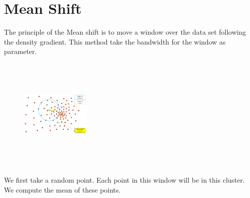 \section{Mean Shift}

The principle of the Mean shift is to move a window over the data set following the density gradient. This method take the bandwidth for the window as parameter.\\
\begin{figure}[h!]
\includegraphics[width=0.3\textwidth, height=5.5cm]{Image/algo-meanshift1.png}
\end{figure}

We first take a random point. Each point in this window will be in this cluster. We compute the mean of these points.


\begin{center}

\end{center}

